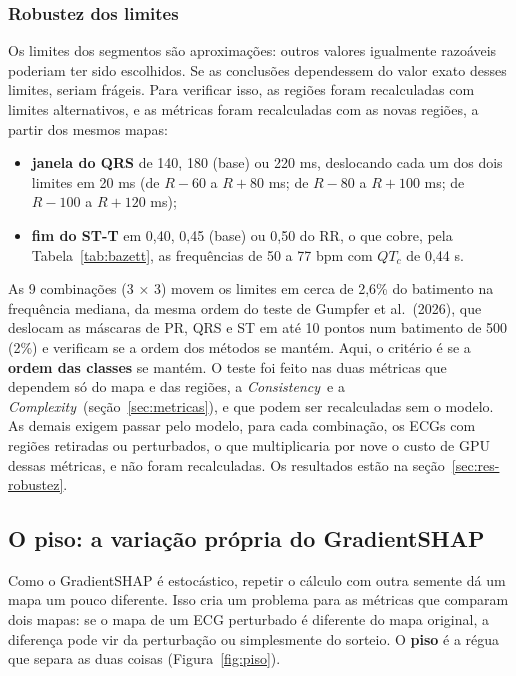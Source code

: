 \documentclass[11pt,a4paper]{article}
\newcommand{\CX}{\textit{Complexity}}
\newcommand{\CS}{\textit{Consistency}}
\begin{document}
\subsubsection{Robustez dos limites}\label{sec:robustez-metodo}
Os limites dos segmentos são aproximações: outros valores igualmente razoáveis poderiam ter sido escolhidos. Se as conclusões dependessem do valor exato desses limites, seriam frágeis. Para verificar isso, as regiões foram recalculadas com limites alternativos, e as métricas foram recalculadas com as novas regiões, a partir dos mesmos mapas:
\begin{itemize}
\item \textbf{janela do QRS} de 140, 180 (base) ou 220 ms, deslocando cada um dos dois limites em 20 ms (de $R - 60$ a $R + 80$ ms; de $R - 80$ a $R + 100$ ms; de $R - 100$ a $R + 120$ ms);
\item \textbf{fim do ST-T} em 0,40, 0,45 (base) ou 0,50 do RR, o que cobre, pela Tabela~\ref{tab:bazett}, as frequências de 50 a 77 bpm com $QT_c$ de 0,44 s.
\end{itemize}
As 9 combinações (3 × 3) movem os limites em cerca de 2,6\% do batimento na frequência mediana, da mesma ordem do teste de Gumpfer et al.\ (2026), que deslocam as máscaras de PR, QRS e ST em até 10 pontos num batimento de 500 (2\%) e verificam se a ordem dos métodos se mantém. Aqui, o critério é se a \textbf{ordem das classes} se mantém. O teste foi feito nas duas métricas que dependem só do mapa e das regiões, a \CS\ e a \CX\ (seção~\ref{sec:metricas}), e que podem ser recalculadas sem o modelo. As demais exigem passar pelo modelo, para cada combinação, os ECGs com regiões retiradas ou perturbados, o que multiplicaria por nove o custo de GPU dessas métricas, e não foram recalculadas. Os resultados estão na seção~\ref{sec:res-robustez}.

\subsection{O piso: a variação própria do GradientSHAP}\label{sec:piso}

Como o GradientSHAP é estocástico, repetir o cálculo com outra semente dá um mapa um pouco diferente. Isso cria um problema para as métricas que comparam dois mapas: se o mapa de um ECG perturbado é diferente do mapa original, a diferença pode vir da perturbação ou simplesmente do sorteio. O \textbf{piso} é a régua que separa as duas coisas (Figura~\ref{fig:piso}).
\end{document}
